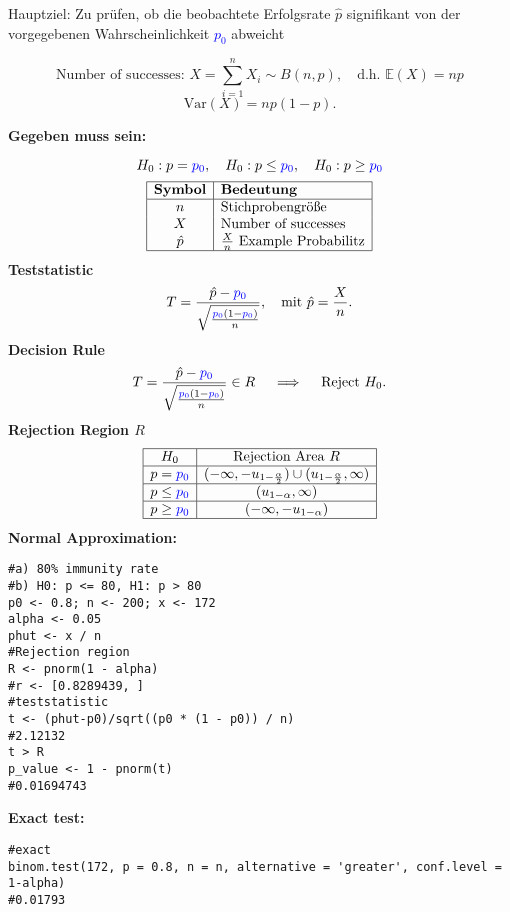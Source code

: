 Hauptziel: Zu prüfen, ob die beobachtete Erfolgsrate $\hat{p}$ signifikant von der vorgegebenen Wahrscheinlichkeit \textcolor{blue}{$p_0$} abweicht
\begin{center}
$$
\text{Number of successes: } X = \sum_{i=1}^n X_i \sim B(n, p), \quad \text{d.h. } \mathbb{E}(X) = np
$$$$
\text{Var}(X) = np(1-p).
$$
\end{center}
\large{\textbf{Gegeben muss sein:}}

\[
H_0: p = \textcolor{blue}{\textcolor{blue}{p_0}}, \quad H_0: p \leq \textcolor{blue}{p_0}, \quad H_0: p \geq \textcolor{blue}{p_0}
\]
\[
\begin{array}{|c|l|}
\hline
\textbf{Symbol} & \textbf{Bedeutung} \\
\hline
n& \text{Stichprobengröße} \\
X & \text{Number of successes} \\
\hat{p}& \frac{X}{n} \text{ Example Probabilitz} \\
\hline
\end{array}
\]
\large{\textbf{Teststatistic}}
$$
T = \frac{\hat{p} - \textcolor{blue}{p_0}}{\sqrt{\frac{\textcolor{blue}{p_0}(1-\textcolor{blue}{p_0})}{n}}}, \quad \text{mit } \hat{p} = \frac{X}{n}.
$$
\large{\textbf{Decision Rule}}
$$
T = \frac{\hat{p} - \textcolor{blue}{p_0}}{\sqrt{\frac{\textcolor{blue}{p_0}(1-\textcolor{blue}{p_0})}{n}}} \in R \quad \implies \quad \text{Reject } H_0.
$$
\large{\textbf{Rejection Region $R$}}
\[
\begin{array}{|c|c|}
\hline
H_0 & \text{Rejection Area } R \\ \hline
p = \textcolor{blue}{p_0} & (-\infty, -u_{1-\frac{\alpha}{2}}) \cup (u_{1-\frac{\alpha}{2}}, \infty) \\ \hline
p \leq \textcolor{blue}{p_0} & (u_{1-\alpha}, \infty) \\ \hline
p \geq \textcolor{blue}{p_0} & (-\infty, -u_{1-\alpha}) \\ \hline
\end{array}
\]
\large{\textbf{Normal Approximation:}}
\begin{lstlisting}
#a) 80% immunity rate
#b) H0: p <= 80, H1: p > 80
p0 <- 0.8; n <- 200; x <- 172
alpha <- 0.05
phut <- x / n
#Rejection region
R <- pnorm(1 - alpha)
#r <- [0.8289439, ]
#teststatistic
t <- (phut-p0)/sqrt((p0 * (1 - p0)) / n)
#2.12132
t > R
p_value <- 1 - pnorm(t)
#0.01694743
\end{lstlisting}
\large{\textbf{Exact test:}}
\begin{lstlisting}
#exact
binom.test(172, p = 0.8, n = n, alternative = 'greater', conf.level = 1-alpha)
#0.01793
\end{lstlisting}
